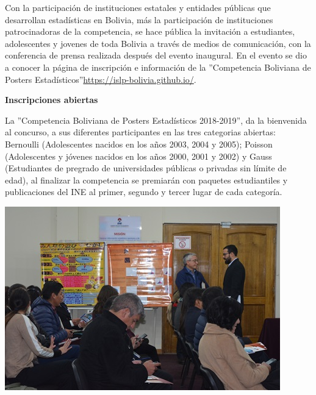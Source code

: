 \documentclass[8pt,a4paper]{article} %
\newcommand{\NewsItem}[1]{ %
\usefont{T1}{fvs}{n}{n} %
\vspace{24pt}\large #1\vspace{3pt} %
\par \normalsize \normalfont}
\begin{document}
\begin{multicols}{2}
Con la participación de instituciones estatales y entidades públicas que desarrollan estadísticas en Bolivia, más la participación de instituciones patrocinadoras de la competencia, se hace pública la invitación a estudiantes, adolescentes y jovenes de toda Bolivia a través de medios de comunicación, con la conferencia de prensa realizada después del evento inaugural. En el evento se dio a conocer la página de inscripción e información de la ''Competencia Boliviana de Posters Estadísticos''\url{https://islp-bolivia.github.io/}.


\NewsItem{\textbf{Inscripciones abiertas}}

La ''Competencia Boliviana de Posters Estadísticos 2018-2019'', da la bienvenida al concurso, a sus diferentes participantes en las tres categorias abiertas: Bernoulli (Adolescentes nacidos en los años 2003, 2004 y 2005); Poisson (Adolescentes y jóvenes nacidos en los años 2000, 2001 y 2002) y Gauss (Estudiantes de pregrado de universidades públicas o privadas sin límite de edad), al finalizar la competencia se premiarán con paquetes estudiantiles y publicaciones del INE  al  primer, segundo y tercer lugar de cada categoría.

\vspace{0.5cm}

\begin{center}
\includegraphics[scale=0.6]{foto6.jpg} %
\end{center}

\vspace{10cm}


\end{multicols}
\end{document}

